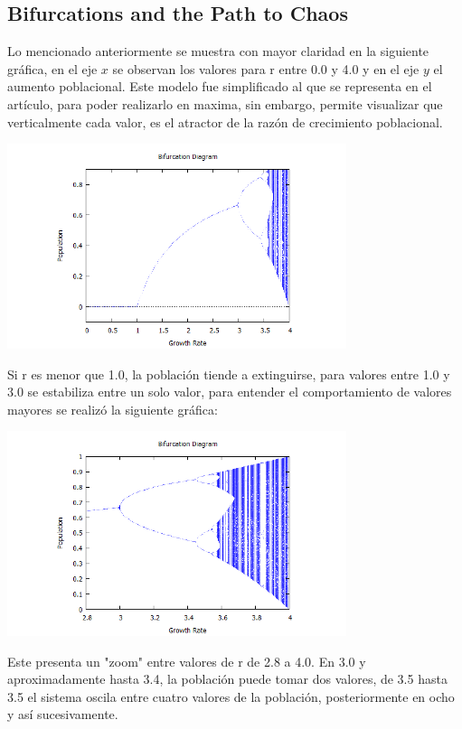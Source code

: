 \documentclass[12pt]{article}
\begin{document}
\subsection{Bifurcations and the Path to Chaos}

Lo mencionado anteriormente se muestra con mayor claridad en la siguiente gráfica, en el eje $x$ se observan los valores para r entre 0.0 y 4.0 y en el eje $y$ el aumento poblacional. Este modelo fue simplificado al que se representa en el artículo, para poder realizarlo en maxima, sin embargo, permite visualizar que verticalmente cada valor, es el atractor de la razón de crecimiento poblacional.

\begin{center}
 \includegraphics[height=6cm]{2.png}
 \end{center}

Si r es menor que 1.0, la población tiende a extinguirse, para valores entre 1.0 y 3.0 se estabiliza entre un solo valor, para entender el comportamiento de valores mayores se realizó la siguiente gráfica:

\begin{center}
 \includegraphics[height=6cm]{3.png}
 \end{center}

Este presenta un "zoom" entre valores de r de 2.8 a 4.0. En 3.0 y aproximadamente hasta 3.4, la población puede tomar dos valores, de 3.5 hasta 3.5 el sistema oscila entre cuatro valores de la población, posteriormente en ocho y así sucesivamente. 
\end{document}
